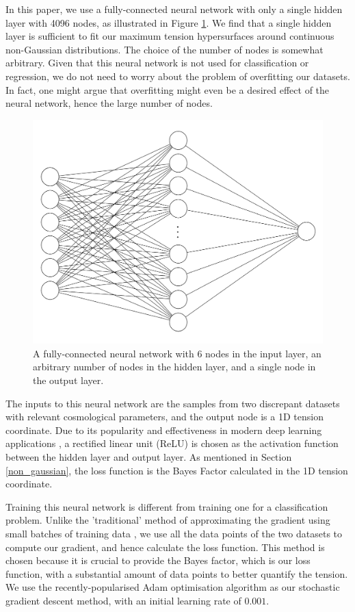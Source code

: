 \documentclass[%
 reprint,
 amsmath,amssymb,
 aps,
]{revtex4-2}
\begin{document}
In this paper, we use a fully-connected neural network with only a single hidden layer with 4096 nodes, as illustrated in Figure \ref{fig:NN}. We find that a single hidden layer is sufficient to fit our maximum tension hypersurfaces around continuous non-Gaussian distributions. The choice of the number of nodes is somewhat arbitrary. Given that this neural network is not used for classification or regression, we do not need to worry about the problem of overfitting our datasets. In fact, one might argue that overfitting might even be a desired effect of the neural network, hence the large number of nodes.

\begin{figure}
    \includegraphics[width=0.8\columnwidth]{images/nn.png}
    \centering
    \caption{A fully-connected neural network with 6 nodes in the input layer, an arbitrary number of nodes in the hidden layer, and a single node in the output layer.}
    \label{fig:NN}
\end{figure}

The inputs to this neural network are the samples from two discrepant datasets with relevant cosmological parameters, and the output node is a 1D tension coordinate. Due to its popularity and effectiveness in modern deep learning applications \cite{Nwankpa2018}, a rectified linear unit (ReLU) \cite{Nair2010} is chosen as the activation function between the hidden layer and output layer.  As mentioned in Section \ref{non_gaussian}, the loss function is the Bayes Factor calculated in the 1D tension coordinate.

Training this neural network is different from training one for a classification problem. Unlike the 'traditional' method of approximating the gradient using small batches of training data \cite{Keskar2017}, we use all the data points of the two datasets to compute our gradient, and hence calculate the loss function. This method is chosen because it is crucial to provide the Bayes factor, which is our loss function, with a substantial amount of data points to better quantify the tension. We use the recently-popularised Adam optimisation algorithm \cite{Kingma2017} as our stochastic gradient descent method, with an initial learning rate of $0.001$.
\end{document}
